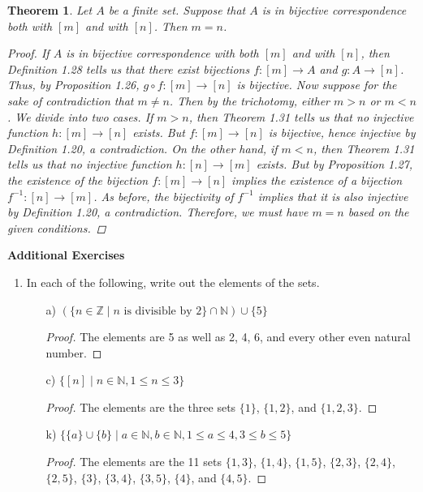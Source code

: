 \documentclass[titlepage]{article}
\newcounter{script}
\newtheorem{theorem}{Theorem}[script]
\theoremstyle{definition}
\newcommand{\N}{\mathbb{N}}
\newcommand{\Z}{\mathbb{Z}}
\begin{document}
\setcounter{theorem}{31}

\begin{theorem}
    Let $A$ be a finite set. Suppose that $A$ is in bijective correspondence both with $[m]$ and with $[n]$. Then $m=n$.
    \begin{proof}
        If $A$ is in bijective correspondence with both $[m]$ and with $[n]$, then Definition 1.28 tells us that there exist bijections $f:[m]\to A$ and $g:A\to[n]$. Thus, by Proposition 1.26, $g\circ f:[m]\to[n]$ is bijective. Now suppose for the sake of contradiction that $m\neq n$. Then by the trichotomy, either $m>n$ or $m<n$. We divide into two cases. If $m>n$, then Theorem 1.31 tells us that no injective function $h:[m]\to[n]$ exists. But $f:[m]\to[n]$ is bijective, hence injective by Definition 1.20, a contradiction. On the other hand, if $m<n$, then Theorem 1.31 tells us that no injective function $h:[n]\to[m]$ exists. But by Proposition 1.27, the existence of the bijection $f:[m]\to[n]$ implies the existence of a bijection $f^{-1}:[n]\to[m]$. As before, the bijectivity of $f^{-1}$ implies that it is also injective by Definition 1.20, a contradiction. Therefore, we must have $m=n$ based on the given conditions. 
    \end{proof}
\end{theorem}

\noindent\textbf{Additional Exercises}
\begin{enumerate}
    \item In each of the following, write out the elements of the sets.
    \begin{enumerate}
        \item[a)] $(\{n\in\Z\mid n\text{ is divisible by }2\}\cap\N)\cup\{5\}$
        \begin{proof}
            The elements are 5 as well as 2, 4, 6, and every other even natural number.
        \end{proof}
        \item[c)] $\{[n]\mid n\in\N,1\leq n\leq 3\}$
        \begin{proof}
            The elements are the three sets $\{1\}$, $\{1,2\}$, and $\{1,2,3\}$.
        \end{proof}
        \item[k)] $\{\{a\}\cup\{b\}\mid a\in\N,b\in\N,1\leq a\leq 4,3\leq b\leq 5\}$
        \begin{proof}
            The elements are the 11 sets $\{1,3\}$, $\{1,4\}$, $\{1,5\}$, $\{2,3\}$, $\{2,4\}$, $\{2,5\}$, $\{3\}$, $\{3,4\}$, $\{3,5\}$, $\{4\}$, and $\{4,5\}$.
        \end{proof}
    \end{enumerate}
\end{enumerate}
\newpage
\end{document}
